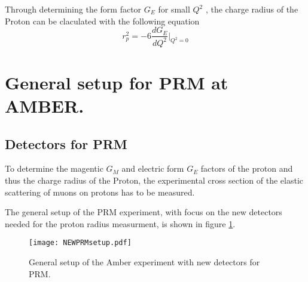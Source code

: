 Through determining the form factor $G_E$ for small $Q^2$ , the charge radius of the Proton can be claculated with the following equation \autocite{intentAmber}
\begin{equation}
\label{eq:charge_radius}
r_p^2 = -6 \frac{dG_E}{dQ^2} \bigg|_{Q^2 = 0}
\end{equation}

\section{General setup for PRM at AMBER.}\label{sec:general_setup}
\subsection{Detectors for PRM}

To determine the magentic $G_M$ and electric form $G_E$ factors of the proton and thus the charge radius of the Proton,
 the experimental cross section of the elastic scattering of muons on protons has to be measured.

The general setup of the PRM experiment, with focus on the new detectors needed for the proton radius measurment, is shown in figure \ref{fig:amber_setup}.
\begin{figure}[H]
	\centering
	\texttt{[image: NEWPRMsetup.pdf]}
	\caption{General setup of the Amber experiment with new detectors for PRM.
	\autocite{InternalcommunicationKarl}}
	\label{fig:amber_setup}
\end{figure}

